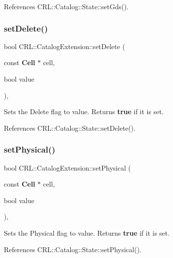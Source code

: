 References C\+R\+L\+::\+Catalog\+::\+State\+::set\+Gds().

\mbox{\label{classCRL_1_1CatalogExtension_a8a5bdbfb8c898f8ea00c8718c6714983}} 
\subsubsection{\texorpdfstring{set\+Delete()}{setDelete()}}
{\footnotesize\ttfamily bool C\+R\+L\+::\+Catalog\+Extension\+::set\+Delete (\begin{DoxyParamCaption}\item[{const \textbf{ Cell} $\ast$}]{cell,  }\item[{bool}]{value }\end{DoxyParamCaption})\hspace{0.3cm}{\ttfamily [inline]}, {\ttfamily [static]}}

Sets the Delete flag to {\ttfamily value}. Returns {\bfseries true} if it is set. 

References C\+R\+L\+::\+Catalog\+::\+State\+::set\+Delete().

\mbox{\label{classCRL_1_1CatalogExtension_ae3de9795e0ddce5a767cf53d79fec077}} 
\subsubsection{\texorpdfstring{set\+Physical()}{setPhysical()}}
{\footnotesize\ttfamily bool C\+R\+L\+::\+Catalog\+Extension\+::set\+Physical (\begin{DoxyParamCaption}\item[{const \textbf{ Cell} $\ast$}]{cell,  }\item[{bool}]{value }\end{DoxyParamCaption})\hspace{0.3cm}{\ttfamily [inline]}, {\ttfamily [static]}}

Sets the Physical flag to {\ttfamily value}. Returns {\bfseries true} if it is set. 

References C\+R\+L\+::\+Catalog\+::\+State\+::set\+Physical().

